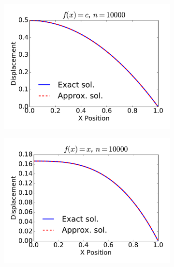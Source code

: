 \documentclass{article}
\begin{document}
\begin{figure}
        \begin{subfigure}[b]{0.33\textwidth}
                \includegraphics[width=\linewidth]{displacement_func0_Nell10000}
                \label{fig:gull}
        \end{subfigure}%
        \begin{subfigure}[b]{0.33\textwidth}
                \includegraphics[width=\linewidth]{displacement_func1_Nell10000}
                \label{fig:gull2}
        \end{subfigure}%
        \begin{subfigure}[b]{0.33\textwidth}

\end{subfigure}
\end{figure}
\end{document}
